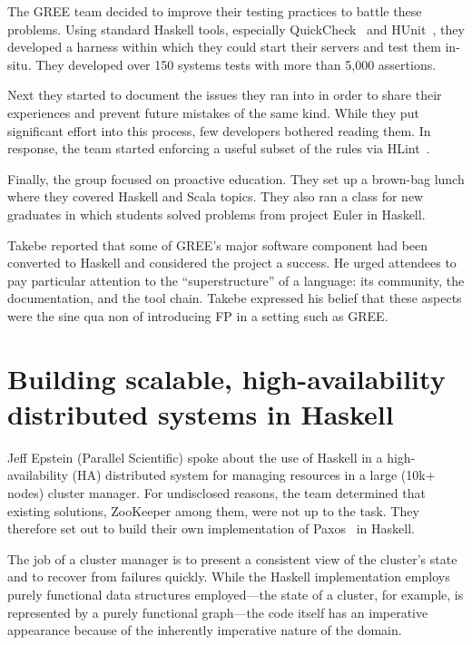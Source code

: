 \documentclass{jfp1}
\begin{document}
The GREE team decided to improve their testing practices to battle these
problems. Using standard Haskell tools, especially
QuickCheck~\cite{Claessen:2011:Quickcheck} and
HUnit~\cite{Herington:2014:HUnit}, they developed a harness within which
they could start their servers and test them in-situ. They developed over
150 systems tests with more than 5,000 assertions.

Next they started to document the issues they ran into in order to share
their experiences and prevent future mistakes of the same kind.  While they
put significant effort into this process, few developers bothered reading
them. In response, the team started enforcing a useful subset of the rules
via HLint~\cite{Mitchell:2014:HLint}.

Finally, the group focused on proactive education. They set up a brown-bag
lunch where they covered Haskell and Scala topics. They also ran a class
for new graduates in which students solved problems from project Euler in
Haskell.

Takebe reported that some of GREE's major software component had been
converted to Haskell and considered the project a success. He urged
attendees to pay particular attention to the ``superstructure'' of a
language: its community, the documentation, and the tool chain. Takebe
expressed his belief that these aspects were the sine qua non of
introducing FP in a setting such as GREE.

\section{Building scalable, high-availability distributed systems in Haskell}


Jeff Epstein (Parallel Scientific) spoke about the use of Haskell in a
high-availability (HA) distributed system for managing resources in a large
(10k+ nodes) cluster manager.  For undisclosed reasons, the team determined
that existing solutions, ZooKeeper among them, were not up to the
task. They therefore set out to build their own implementation of
Paxos~\cite{Lamport:1998:Part} in Haskell.

The job of a cluster manager is to present a consistent view of the
cluster's state and to recover from failures quickly. While the Haskell
implementation employs purely functional data structures employed---the
state of a cluster, for example, is represented by a purely functional
graph---the code itself has an imperative appearance because of the
inherently imperative nature of the domain.
\end{document}
